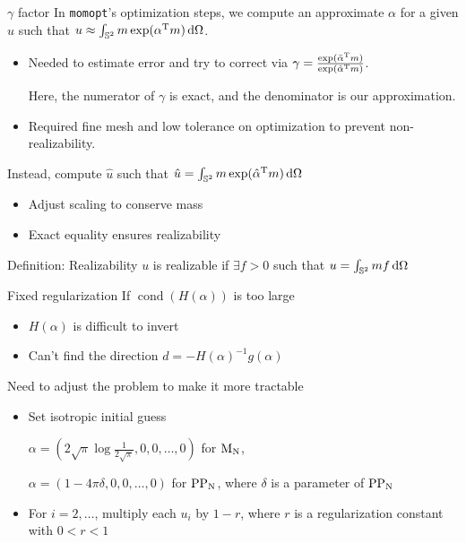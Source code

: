 \documentclass{beamer}
\DeclareMathOperator{\cond}{cond}
\renewcommand{\vec}[1]{\ensuremath{#1}}
\newcommand{\integral}[1]{\ensuremath{\int_{\mathbb{S}^2} #1 \dif \Omega}}
\newcommand{\T}[1]{\ensuremath{#1^\textnormal{T}}}
\newcommand{\MN}{\ensuremath{\textnormal{M}_\textnormal{N}}\xspace}
\newcommand{\PPN}{\ensuremath{\textnormal{PP}_\textnormal{N}}\xspace}
\newcommand{\momopt}{\texttt{momopt}\xspace}
\begin{document}
    \begin{frame}{$\gamma$ factor}
        In \momopt's optimization steps, we compute an approximate \vec{\alpha} for a given \vec{u} such that $\vec{u} \approx \integral{\vec{m} \exp (\T{\vec{\alpha}} \vec{m})}$.
        \begin{itemize}
            \item Needed to estimate error and try to correct via $\gamma = \frac{\exp(\T{\bar{\vec{\alpha}}} \vec{m})}{\exp(\T{\hat{\vec{\alpha}}} \vec{m})}$.

                Here, the numerator of $\gamma$ is exact, and the denominator is our approximation.
            \item Required fine mesh and low tolerance on optimization to prevent non-realizability.
        \end{itemize}

        \vfill

        Instead, compute $\hat{\vec{u}}$ such that $\hat{\vec{u}} = \integral{\vec{m} \exp(\T{\hat{\vec{\alpha}}} \vec{m})}$
        \begin{itemize}
            \item Adjust scaling to conserve mass
            \item \alert{Exact equality ensures realizability}
        \end{itemize}

        \vfill

        \begin{block}{Definition: Realizability}
            \vec{u} is realizable if $\exists f > 0$ such that $u = \integral{\vec{m} f}$
        \end{block}
    \end{frame}

    \begin{frame}{Fixed regularization}
        If $\cond(H(\vec{\alpha}))$ is too large
        \begin{itemize}
            \item $H(\vec{\alpha})$ is difficult to invert
            \item Can't find the direction $\vec{d} = -H(\vec{\alpha})^{-1}g(\vec{\alpha})$
        \end{itemize}

        \vfill

        Need to adjust the problem to make it more tractable
        \begin{itemize}
            \item Set isotropic initial guess

                $\vec{\alpha} = (2\sqrt{\pi} \log \frac{1}{2\sqrt{\pi}}, 0, 0, \dots, 0)$ for \MN,

                $\vec{\alpha} = (1 - 4\pi\delta, 0, 0, \dots, 0)$ for \PPN, where $\delta$ is a parameter of \PPN
            \item For $i = 2,\dots$, multiply each $u_i$ by $1 - r$, where $r$ is a regularization constant with $0 < r < 1$
        \end{itemize}
    \end{frame}
\end{document}
